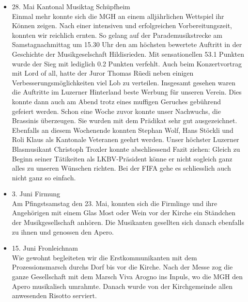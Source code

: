 \begin{history}
\begin{itemize}
            \item  28. Mai Kantonal Musiktag Schüpfheim\\
                  Einmal mehr konnte sich die MGH an einem alljährlichen Wettspiel
                  ihr Können zeigen. Nach einer intensiven und erfolgreichen
                  Vorbereitungszeit, konnten wir reichlich ernten. So gelang auf der
                  Parademusikstrecke am Samstagnachmittag um 15.30 Uhr den am
                  höchsten bewertete Auftritt in der Geschichte der Musikgeselschaft
                  Hildisrieden. Mit sensationellen 53.1 Punkten wurde der Sieg mit
                  lediglich 0.2 Punkten verfehlt. Auch beim Konzertvortrag mit Lord
                  of all, hatte der Juror Thomas Rüedi neben einigen
                  Verbesserungsmöglichkeiten viel Lob zu verteilen. Insgesamt
                  gesehen waren die Auftritte im Luzerner Hinterland beste Werbung
                  für unseren Verein. Dies konnte dann auch am Abend trotz eines
                  muffigen Geruches gebührend gefeiert werden. Schon eine Woche
                  zuvor konnte unser Nachwuchs, die Brassinis überzeugen. Sie wurden
                  mit dem Prädikat sehr gut ausgezeichnet. Ebenfalls an diesem
                  Wochenende konnten Stephan Wolf, Hans Stöckli und Roli Klaus als
                  Kantonale Veteranen geehrt werden. Unser höchster Luzerner
                  Blasmusikant Christoph Troxler konnte abschliessend Fazit ziehen:
                  Gleich zu Beginn seiner Tätikeiten als LKBV-Präsident könne er
                  nicht sogleich ganz alles zu unseren Wünschen richten. Bei der
                  FIFA gehe es schliesslich auch nicht ganz so einfach.

            \item 3. Juni Firmung\\
                  Am Pfingstsamstag den 23. Mai, konnten sich die Firmlinge und ihre
                  Angehörigen mit einem Glas Most oder Wein vor der Kirche ein
                  Ständchen der Musikgesellschaft anhören. Die Musikanten gesellten
                  sich danach ebenfalls zu ihnen und genossen den Apero.

            \item 15. Juni Fronleichnam\\
                  Wie gewohnt begleiteten wir die Erstkommunikanten mit dem
                  Prozessionsmarsch durchs Dorf bis vor die Kirche. Nach der Messe
                  zog die ganze Gesellschaft mit dem Marsch Viva Arogno ins Inpuls,
                  wo die MGH den Apero musikalisch umrahmte. Danach wurde von der
                  Kirchgemeinde allen anwesenden Risotto serviert.


\end{itemize}
\end{history}

